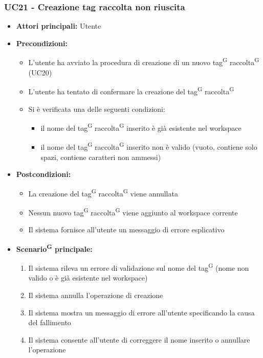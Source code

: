 \documentclass[a4paper, 11pt]{article}
\begin{document}
\subsubsection{UC21 - Creazione tag raccolta non riuscita} \label{UC21}
\begin{itemize}
	\item \textbf{Attori principali:} Utente
	\item \textbf{Precondizioni:}
	\begin{itemize}
		\item L'utente ha avviato la procedura di creazione di un nuovo tag\textsuperscript{G} raccolta\textsuperscript{G} (UC20)
		\item L'utente ha tentato di confermare la creazione del tag\textsuperscript{G} raccolta\textsuperscript{G}
		\item Si è verificata una delle seguenti condizioni:
		\begin{itemize}
			\item il nome del tag\textsuperscript{G} raccolta\textsuperscript{G} inserito è già esistente nel workspace
			\item il nome del tag\textsuperscript{G} raccolta\textsuperscript{G} inserito non è valido (vuoto, contiene solo spazi, contiene caratteri non ammessi)
		\end{itemize}
	\end{itemize}
	\item \textbf{Postcondizioni:}
	\begin{itemize}
		\item La creazione del tag\textsuperscript{G} raccolta\textsuperscript{G} viene annullata
		\item Nessun nuovo tag\textsuperscript{G} raccolta\textsuperscript{G} viene aggiunto al workspace corrente
		\item Il sistema fornisce all'utente un messaggio di errore esplicativo
	\end{itemize}
	\item \textbf{Scenario\textsuperscript{G} principale:}
	\begin{enumerate}
		\item Il sistema rileva un errore di validazione sul nome del tag\textsuperscript{G} (nome non valido o è già esistente nel workspace)
		\item Il sistema annulla l'operazione di creazione
		\item Il sistema mostra un messaggio di errore all'utente specificando la causa del fallimento
		\item Il sistema consente all'utente di correggere il nome inserito o annullare l'operazione
	\end{enumerate}
\end{itemize}
\end{document}
